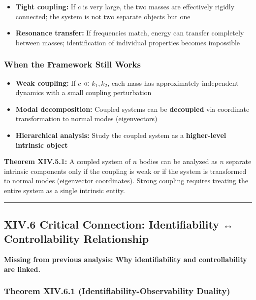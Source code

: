 \documentclass[
]{article}
\providecommand{\tightlist}{%
  \setlength{\itemsep}{0pt}\setlength{\parskip}{0pt}}
\begin{document}
\begin{itemize}
\tightlist
\item
  \textbf{Tight coupling:} If \(c\) is very large, the two masses are
  effectively rigidly connected; the system is not two separate objects
  but one
\item
  \textbf{Resonance transfer:} If frequencies match, energy can transfer
  completely between masses; identification of individual properties
  becomes impossible
\end{itemize}

\subsubsection{When the Framework Still
Works}\label{when-the-framework-still-works-3}

\begin{itemize}
\tightlist
\item
  \textbf{Weak coupling:} If \(c \ll k_1, k_2\), each mass has
  approximately independent dynamics with a small coupling perturbation
\item
  \textbf{Modal decomposition:} Coupled systems can be
  \textbf{decoupled} via coordinate transformation to normal modes
  (eigenvectors)
\item
  \textbf{Hierarchical analysis:} Study the coupled system as a
  \textbf{higher-level intrinsic object}
\end{itemize}

\textbf{Theorem XIV.5.1:} A coupled system of \(n\) bodies can be
analyzed as \(n\) separate intrinsic components only if the coupling is
weak or if the system is transformed to normal modes (eigenvector
coordinates). Strong coupling requires treating the entire system as a
single intrinsic entity.

\begin{center}\rule{0.5\linewidth}{0.5pt}\end{center}

\subsection{XIV.6 Critical Connection: Identifiability ↔ Controllability
Relationship}\label{xiv.6-critical-connection-identifiability-controllability-relationship}

\textbf{Missing from previous analysis: Why identifiability and
controllability are linked.}

\subsubsection{Theorem XIV.6.1 (Identifiability-Observability
Duality)}\label{theorem-xiv.6.1-identifiability-observability-duality}
\end{document}
